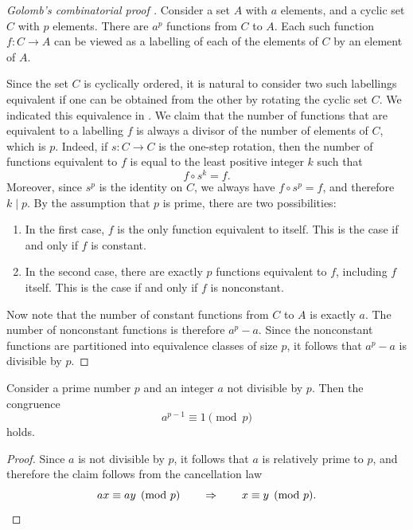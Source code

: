 \begin{proof}[Golomb's combinatorial proof \cite{golomb1956}]
  Consider a set $A$ with $a$ elements, and a cyclic set $C$ with $p$ elements. There are $a^p$ functions from $C$ to $A$. Each such function $f:C\to A$ can be viewed as a labelling of each of the elements of $C$ by an element of $A$.

  Since the set $C$ is cyclically ordered, it is natural to consider two such labellings equivalent if one can be obtained from the other by rotating the cyclic set $C$. We indicated this equivalence in . We claim that the number of functions that are equivalent to a labelling $f$ is always a divisor of the number of elements of $C$, which is $p$. Indeed, if $s:C\to C$ is the one-step rotation, then the number of functions equivalent to $f$ is equal to the least positive integer $k$ such that
  \begin{equation*}
    f\circ s^k=f.
  \end{equation*}
  Moreover, since $s^p$ is the identity on $C$, we always have $f\circ s^p=f$, and therefore $k\mid p$. By the assumption that $p$ is prime, there are two possibilities:
  \begin{enumerate}
  \item In the first case, $f$ is the only function equivalent to itself. This is the case if and only if $f$ is constant.
  \item In the second case, there are exactly $p$ functions equivalent to $f$, including $f$ itself. This is the case if and only if $f$ is nonconstant.
  \end{enumerate}
  Now note that the number of constant functions from $C$ to $A$ is exactly $a$. The number of nonconstant functions is therefore $a^p-a$. Since the nonconstant functions are partitioned into equivalence classes of size $p$, it follows that $a^p-a$ is divisible by $p$.
\end{proof}

\begin{corollary}
  Consider a prime number $p$ and an integer $a$ not divisible by $p$. Then the congruence
  \begin{equation*}
    a^{p-1}\equiv 1\pmod{p}
  \end{equation*}
  holds.
\end{corollary}

\begin{proof}
  Since $a$ is not divisible by $p$, it follows that $a$ is relatively prime to $p$, and therefore the claim follows from the cancellation law
  \begin{equation*}
    ax\equiv ay\pmod{p}\qquad\Rightarrow\qquad x\equiv y\pmod{p}.\qedhere
  \end{equation*}
\end{proof}

